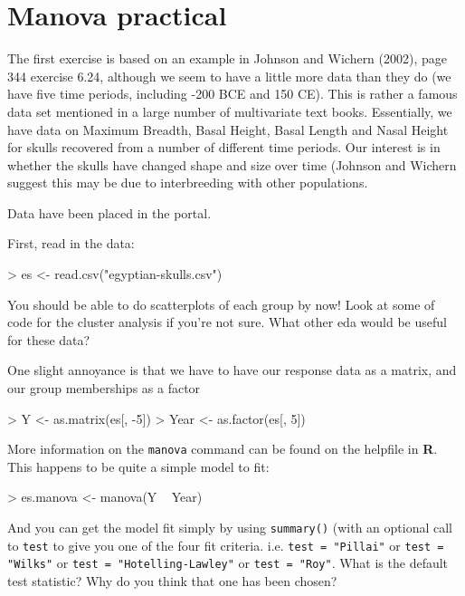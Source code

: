 
\section{Manova practical}


The first exercise is based on an example in Johnson and Wichern (2002), page 344 exercise 6.24, although we seem to have a little more data than they do (we have five time periods, including -200 BCE and 150 CE).   This is rather a famous data set mentioned in a large number of multivariate text books.   Essentially, we have data on Maximum Breadth, Basal Height, Basal Length and Nasal Height for skulls recovered from a number of different time periods.   Our interest is in whether the skulls have changed shape and size over time (Johnson and Wichern suggest this may be due to interbreeding with other populations.

Data have been placed in the portal.

First, read in the data:

\begin{Schunk}
\begin{Sinput}
> es <- read.csv("egyptian-skulls.csv")
\end{Sinput}
\end{Schunk}

You should be able to do scatterplots of each group by now!   Look at some of code for the cluster analysis if you're not sure.   What other eda would be useful for these data?

One slight annoyance is that we have to have our response data as a matrix, and our group memberships as a factor

\begin{Schunk}
\begin{Sinput}
> Y <- as.matrix(es[, -5])
> Year <- as.factor(es[, 5])
\end{Sinput}
\end{Schunk}

More information on the \texttt{manova} command can be found on the helpfile in \textbf{R}.   This happens to be quite a simple model to fit:


\begin{Schunk}
\begin{Sinput}
> es.manova <- manova(Y ~ Year)
\end{Sinput}
\end{Schunk}

And you can get the model fit simply by using \texttt{summary()} (with an optional call to \texttt{test} to give you one of the four fit criteria. i.e. \texttt{test = "Pillai"} or \texttt{test = "Wilks"} or \texttt{test = "Hotelling-Lawley"} or \texttt{test = "Roy"}.   What is the default test statistic?   Why do you think that one has been chosen?

